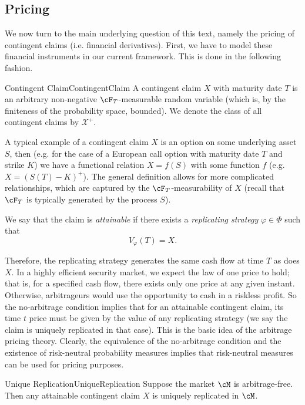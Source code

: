 \subsection{Pricing}
We now turn to the main underlying question of this text, namely the pricing of contingent claims (i.e. financial derivatives). First, we have to model these financial instruments in our current framework. This is done in the following fashion.

\begin{defn}{Contingent Claim}{ContingentClaim}
	A contingent claim $X$ with maturity date $T$ is an arbitrary non-negative $\cF_T$-measurable random variable (which is, by the finiteness of the probability space, bounded). We denote the class of all contingent claims by $\mathcal{X}^+$.
\end{defn}

A typical example of a contingent claim $X$ is an option on some underlying asset $S$, then (e.g. for the case of a European call option with maturity date $T$ and strike $K$) we have a functional relation $X = f(S)$ with some function $f$ (e.g. $X = (S(T) - K)^+$). The general definition allows for more complicated relationships, which are captured by the $\cF_T$-measurability of $X$ (recall that $\cF_T$ is typically generated by the process $S$).

We say that the claim is \textit{attainable} if there exists a \textit{replicating strategy} $\varphi \in \Phi$ such that
\[
	V_{\varphi}(T) = X.
\]

Therefore, the replicating strategy generates the same cash flow at time $T$ as does $X$. In a highly efficient security market, we expect the law of one price to hold; that is, for a specified cash flow, there exists only one price at any given instant. Otherwise, arbitrageurs would use the opportunity to cash in a riskless profit. So the no-arbitrage condition implies that for an attainable contingent claim, its time $t$ price must be given by the value of any replicating strategy (we say the claim is uniquely replicated in that case). This is the basic idea of the arbitrage pricing theory. Clearly, the equivalence of the no-arbitrage condition and the existence of risk-neutral probability measures implies that risk-neutral measures can be used for pricing purposes.

\begin{prop}{Unique Replication}{UniqueReplication}
	Suppose the market $\cM$ is arbitrage-free. Then any attainable contingent claim $X$ is uniquely replicated in $\cM$.
\end{prop}


